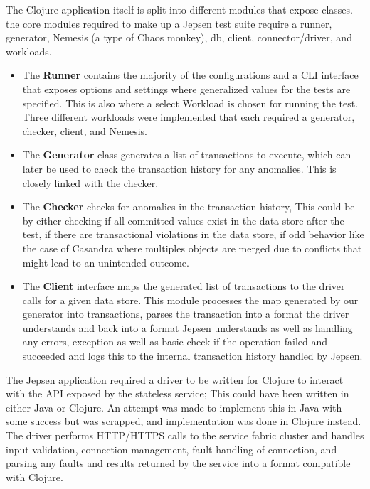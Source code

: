 \documentclass[a4paper,10pt,titlepage]{report}
\begin{document}
       
The Clojure application itself is split into different modules that expose classes. the core modules required to make up a Jepsen test suite require a runner, generator, Nemesis (a type of Chaos monkey)\cite{Choasmonkey}, db, client, connector/driver, and workloads.
\begin{itemize}
   \item The \textbf{Runner} contains the majority of the configurations and a CLI interface that exposes options and settings where generalized values for the tests are specified. This is also where a select Workload is chosen for running the test. Three different workloads were implemented that each required a generator, checker, client, and Nemesis.
       
  \item  The \textbf{Generator} class generates a list of transactions to execute, which can later be used to check the transaction history for any anomalies. This is closely linked with the checker.
       
  \item  The \textbf{Checker} checks for anomalies in the transaction history, This could be by either checking if all committed values exist in the data store after the test, if there are transactional violations in the data store, if odd behavior like the case of Casandra where multiples objects are merged due to conflicts that might lead to an unintended outcome. 
       
 \item  The \textbf{Client} interface maps the generated list of transactions to the driver calls for a given data store. This module processes the map generated by our generator into transactions, parses the transaction into a format the driver understands and back into a format Jepsen understands as well as handling any errors, exception as well as basic check if the operation failed and succeeded and logs this to the internal transaction history handled by Jepsen.
\end{itemize}
       
The Jepsen application required a driver to be written for Clojure to interact with the API exposed by the stateless service; This could have been written in either Java or Clojure. An attempt was made to implement this in Java with some success but was scrapped, and implementation was done in Clojure instead. The driver performs HTTP/HTTPS calls to the service fabric cluster and handles input validation, connection management, fault handling of connection, and parsing any faults and results returned by the service into a format compatible with Clojure.
       
\end{document}
